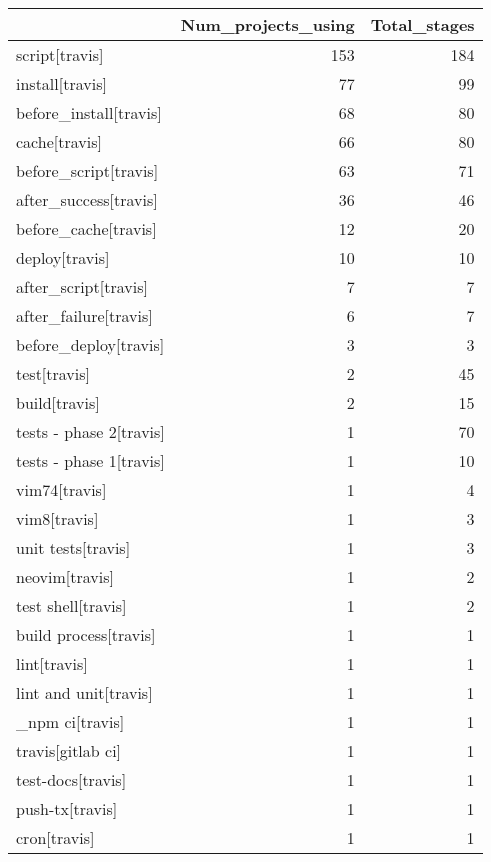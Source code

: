\begin{tabular}{lrr}
\toprule
{} &  Num\_projects\_using &  Total\_stages \\
\midrule
script[travis]          &                 153 &           184 \\
install[travis]         &                  77 &            99 \\
before\_install[travis]  &                  68 &            80 \\
cache[travis]           &                  66 &            80 \\
before\_script[travis]   &                  63 &            71 \\
after\_success[travis]   &                  36 &            46 \\
before\_cache[travis]    &                  12 &            20 \\
deploy[travis]          &                  10 &            10 \\
after\_script[travis]    &                   7 &             7 \\
after\_failure[travis]   &                   6 &             7 \\
before\_deploy[travis]   &                   3 &             3 \\
test[travis]            &                   2 &            45 \\
build[travis]           &                   2 &            15 \\
tests - phase 2[travis] &                   1 &            70 \\
tests - phase 1[travis] &                   1 &            10 \\
vim74[travis]           &                   1 &             4 \\
vim8[travis]            &                   1 &             3 \\
unit tests[travis]      &                   1 &             3 \\
neovim[travis]          &                   1 &             2 \\
test shell[travis]      &                   1 &             2 \\
build process[travis]   &                   1 &             1 \\
lint[travis]            &                   1 &             1 \\
lint and unit[travis]   &                   1 &             1 \\
\_npm ci[travis]         &                   1 &             1 \\
travis[gitlab ci]       &                   1 &             1 \\
test-docs[travis]       &                   1 &             1 \\
push-tx[travis]         &                   1 &             1 \\
cron[travis]            &                   1 &             1 \\
\bottomrule
\end{tabular}
